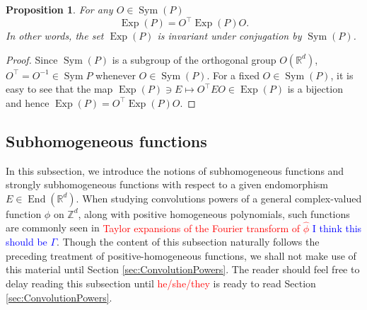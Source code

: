 \documentclass[11pt]{article}
\newtheorem{proposition}[theorem]{Proposition}
\newcommand\End{\operatorname{End}} %
\newcommand\OdR{\mbox{O}_d(\mathbb{R})} %
\newcommand\Sym{\operatorname{Sym}}
\newcommand\Exp{\operatorname{Exp}}
\begin{document}
\begin{proposition}\label{prop:ExpP}
For any  $O \in \Sym{(P)} $
\begin{equation*}
    \Exp(P) = O^\top \Exp(P) O.
\end{equation*}
In other words, the set $\Exp(P)$ is invariant under conjugation by $\Sym(P)$.
\end{proposition}

\begin{proof}
Since $\Sym(P)$ is a subgroup of the orthogonal group $O(\mathbb{R}^d)$, $O^\top = O^{-1} \in \Sym{P}$ whenever $O\in\Sym(P)$. For a fixed $O\in\Sym(P)$, it is easy to see that the map $\Exp(P)\ni E\mapsto  O^\top E O\in\Exp(P)$ is a bijection and hence $\Exp(P)=O^\top \Exp(P) O$. 
\end{proof}

\subsection{Subhomogeneous functions}\label{subsec:SubhomogeneousFunctions}
In this subsection, we introduce the notions of subhomogeneous functions and strongly subhomogeneous functions with respect to a given endomorphism $E\in\End(\mathbb{R}^d)$. When studying convolutions powers of a general complex-valued function $\phi$ on $\mathbb{Z}^d$, along with positive homogeneous polynomials, such functions are commonly seen in \textcolor{red}{Taylor expansions of the Fourier transform of $\widehat{\phi}$} \textcolor{blue}{I think this should be $\Gamma$}. Though the content of this subsection naturally follows the preceding treatment of positive-homogeneous  functions, we shall not make use of this material until Section \ref{sec:ConvolutionPowers}. The reader should feel free to delay reading this subsection until \textcolor{red}{he/she/they} is ready to read Section \ref{sec:ConvolutionPowers}.
\end{document}

